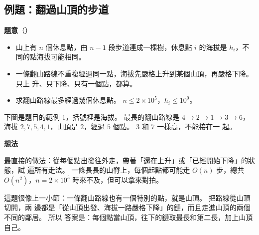 \subsection{例題：翻過山頂的步道}
\label{sec:tdp-ex-summit}

\textbf{題意}（）

\begin{itemize}
\item 山上有 $n$ 個休息點，由 $n - 1$ 段步道連成一棵樹，休息點 $i$ 的海拔是
$h_i$，不同的點海拔可能相同。
\item 一條翻山路線不重複經過同一點，海拔先嚴格上升到某個山頂，再嚴格下降。 只上
升、只下降、只有一個點，都算。
\item 求翻山路線最多經過幾個休息點。 $n \le 2 \times 10^5$，$h_i \le 10^9$。
\end{itemize}

下圖是題目的範例 1，括號裡是海拔。 最長的翻山路線是 $4 \to 2 \to 1 \to 3 \to 6$，
海拔 $2, 7, 5, 4, 1$，山頂是 $2$，經過 $5$ 個點。 $3$ 和 $7$ 一樣高，不能接在一
起。

\begin{center}
\label{fig:tdp-summit}
\end{center}

\textbf{想法}

最直接的做法：從每個點出發往外走，帶著「還在上升」或「已經開始下降」的狀態，試
遍所有走法。 一條長長的山脊上，每個起點都可能走 $O(n)$ 步，總共 $O(n^2)$，$n =
2 \times 10^5$ 時來不及，但可以拿來對拍。

這題很像上一小節：一條翻山路線也有一個特別的點，就是山頂。 把路線從山頂切開，兩
邊都是「從山頂出發、海拔一路嚴格下降」的鏈，而且走進山頂的兩個不同的鄰居。 所以
答案是：每個點當山頂，往下的鏈取最長和第二長，加上山頂自己。

